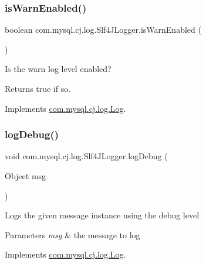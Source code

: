 \subsubsection{\texorpdfstring{is\+Warn\+Enabled()}{isWarnEnabled()}}
{\footnotesize\ttfamily boolean com.\+mysql.\+cj.\+log.\+Slf4\+J\+Logger.\+is\+Warn\+Enabled (\begin{DoxyParamCaption}{ }\end{DoxyParamCaption})}

Is the \textquotesingle{}warn\textquotesingle{} log level enabled?

\begin{DoxyReturn}{Returns}
true if so. 
\end{DoxyReturn}


Implements \mbox{\hyperlink{interfacecom_1_1mysql_1_1cj_1_1log_1_1_log_a7877db04f22a78b801a8f2f8989d7043}{com.\+mysql.\+cj.\+log.\+Log}}.

\mbox{\label{classcom_1_1mysql_1_1cj_1_1log_1_1_slf4_j_logger_aef79b4ff2ba3058fe4f713db62707e6c}} 
\subsubsection{\texorpdfstring{log\+Debug()}{logDebug()}\hspace{0.1cm}{\footnotesize\ttfamily [1/2]}}
{\footnotesize\ttfamily void com.\+mysql.\+cj.\+log.\+Slf4\+J\+Logger.\+log\+Debug (\begin{DoxyParamCaption}\item[{Object}]{msg }\end{DoxyParamCaption})}

Logs the given message instance using the \textquotesingle{}debug\textquotesingle{} level


\begin{DoxyParams}{Parameters}
{\em msg} & the message to log \\
\hline
\end{DoxyParams}


Implements \mbox{\hyperlink{interfacecom_1_1mysql_1_1cj_1_1log_1_1_log_a6149f715730ea0615ef6e341dd3e8a39}{com.\+mysql.\+cj.\+log.\+Log}}.

\mbox{\label{classcom_1_1mysql_1_1cj_1_1log_1_1_slf4_j_logger_aeaf3ce8432b63f1b631e7ad698ea7aa6}} 
